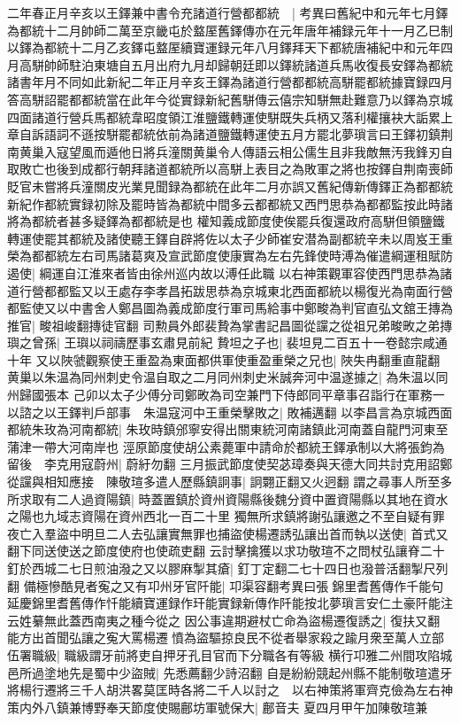 二年春正月辛亥以王鐸兼中書令充諸道行營都都統　|{
	考異曰舊紀中和元年七月鐸為都統十二月帥師二萬至京畿屯於盩厔舊鐸傳亦在元年唐年補録元年十一月乙巳制以鐸為都統十二月乙亥鐸屯盩厔續寶運録元年八月鐸拜天下都統唐補紀中和元年四月高駢帥師駐泊東塘自五月出府九月却歸朝廷即以鐸統諸道兵馬收復長安鐸為都統諸書年月不同如此新紀二年正月辛亥王鐸為諸道行營都都統高駢罷都統據寶録四月答高駢詔罷都都統當在此年今從實録新紀舊駢傳云僖宗知駢無赴難意乃以鐸為京城四面諸道行營兵馬都統韋昭度領江淮鹽鐵轉運使駢既失兵柄又落利權攘袂大詬累上章自訴語詞不遜按駢罷都統依前為諸道鹽鐵轉運使五月方罷北夢瑣言曰王鐸初鎮荆南黄巢入寇望風而遁他日將兵潼關黄巢令人傳語云相公儒生且非我敵無汚我鋒刃自取敗亡也後到成都行朝拜諸道都統所以高駢上表目之為敗軍之將也按鐸自荆南喪師貶官未嘗將兵潼關皮光業見聞録為都統在此年二月亦誤又舊紀傳新傳鐸正為都都統新紀作都統實録初除及罷時皆為都統中間多云都都統又西門思恭為都都監按此時諸將為都統者甚多疑鐸為都都統是也}
權知義成節度使俟罷兵復還政府高駢但領鹽鐵轉運使罷其都統及諸使聽王鐸自辟將佐以太子少師崔安潜為副都統辛未以周岌王重榮為都都統左右司馬諸葛爽及宣武節度使康實為左右先鋒使時溥為催遣綱運租賦防遏使|{
	綱運自江淮來者皆由徐州巡内故以溥任此職}
以右神策觀軍容使西門思恭為諸道行營都都監又以王處存李孝昌拓跋思恭為京城東北西面都統以楊復光為南面行營都監使又以中書舍人鄭昌圖為義成節度行軍司馬給事中鄭畯為判官直弘文舘王摶為推官|{
	畯祖峻翻摶徒官翻}
司勲員外郎裴贄為掌書記昌圖從讜之從祖兄弟畯畋之弟摶璵之曾孫|{
	王璵以祠禱歷事玄肅見前紀}
贄坦之子也|{
	裴坦見二百五十一卷懿宗咸通十年}
又以陜虢觀察使王重盈為東面都供軍使重盈重榮之兄也|{
	陜失冉翻重直龍翻}
黄巢以朱温為同州刺史令温自取之二月同州刺史米誠奔河中温遂據之|{
	為朱温以同州歸國張本}
己卯以太子少傅分司鄭畋為司空兼門下侍郎同平章事召詣行在軍務一以諮之以王鐸判戶部事　朱温寇河中王重榮擊敗之|{
	敗補邁翻}
以李昌言為京城西面都統朱玫為河南都統|{
	朱玫時鎮邠寧安得出關東統河南諸鎮此河南蓋自龍門河東至蒲津一帶大河南岸也}
涇原節度使胡公素薨軍中請命於都統王鐸承制以大將張鈞為留後　李克用寇蔚州|{
	蔚紆勿翻}
三月振武節度使契苾璋奏與天德大同共討克用詔鄭從讜與相知應接　陳敬瑄多遣人歷縣鎮詗事|{
	詗翾正翻又火迥翻}
謂之尋事人所至多所求取有二人過資陽鎮|{
	時蓋置鎮於資州資陽縣後魏分資中置資陽縣以其地在資水之陽也九域志資陽在資州西北一百二十里}
獨無所求鎮將謝弘讓邀之不至自疑有罪夜亡入羣盜中明旦二人去弘讓實無罪也捕盜使楊遷誘弘讓出首而執以送使|{
	首式又翻下同送使送之節度使府也使疏吏翻}
云討擊擒獲以求功敬瑄不之問杖弘讓脊二十釘於西城二七日煎油潑之又以膠麻掣其瘡|{
	釘丁定翻二七十四日也潑普活翻掣尺列翻}
備極慘酷見者寃之又有卭州牙官阡能|{
	卭渠容翻考異曰張錦里耆舊傳作千能句延慶錦里耆舊傳作忏能續寶運録作玕能實録新傳作阡能按北夢瑣言安仁土豪阡能注云姓繤無此蓋西南夷之種今從之}
因公事違期避杖亡命為盜楊遷復誘之|{
	復扶又翻}
能方出首聞弘讓之寃大罵楊遷憤為盜驅掠良民不從者舉家殺之踰月衆至萬人立部伍署職級|{
	職級謂牙前將吏自押牙孔目官而下分職各有等級}
横行卭雅二州間攻陷城邑所過塗地先是蜀中少盜賊|{
	先悉薦翻少詩沼翻}
自是紛紛競起州縣不能制敬瑄遣牙將楊行遷將三千人胡洪畧莫匡時各將二千人以討之　以右神策將軍齊克儉為左右神策内外八鎮兼博野奉天節度使賜鄜坊軍號保大|{
	鄜音夫}
夏四月甲午加陳敬瑄兼

